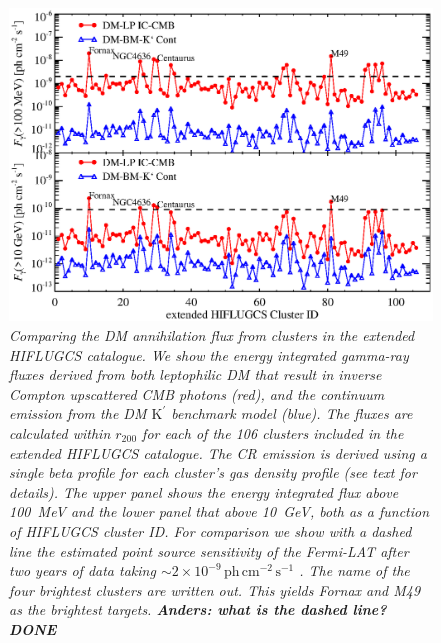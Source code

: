 \documentclass[10pt,aps,pra,reprint,amsmath,amsfonts,amssymb,showpacs,nofootinbib,floatfix]{revtex4-1}
\newcommand{\rmn}{\mathrm}
\newcommand{\Kp}{\rmn{K}^\prime}
\newcommand{\rvir}{r_{200}}
\begin{document}
\begin{figure}%
\begin{minipage}{2.0\columnwidth}
 \includegraphics[width=0.99\columnwidth]{figures/Flux.comp.DM.eps}
\caption{\it Comparing the DM annihilation flux from clusters in the
  extended HIFLUGCS catalogue. We show the energy integrated gamma-ray
  fluxes derived from both leptophilic DM that result in inverse
  Compton upscattered CMB photons (red), and the continuum emission
  from the DM $\Kp$ benchmark model (blue). The fluxes are calculated
  within $\rvir$ for each of the 106 clusters included in the extended
  HIFLUGCS catalogue. The CR emission is derived using a single beta
  profile for each cluster's gas density profile (see text for
  details). The upper panel shows the energy integrated flux above
  100~MeV and the lower panel that above 10~GeV, both as a function of
  HIFLUGCS cluster ID. For comparison we show with a dashed line the
  estimated point source sensitivity of the Fermi-LAT after two years
  of data taking $\sim
  2\times10^{-9}\,\rmn{ph}\,\rmn{cm}^{-2}\,\rmn{s}^{-1}$ . The name of
  the four brightest clusters are written out. This yields Fornax and
  M49 as the brightest targets. {\bf Anders: what is the dashed
    line? DONE}}
 \label{fig21}
\end{minipage}
\end{figure}
\end{document}
